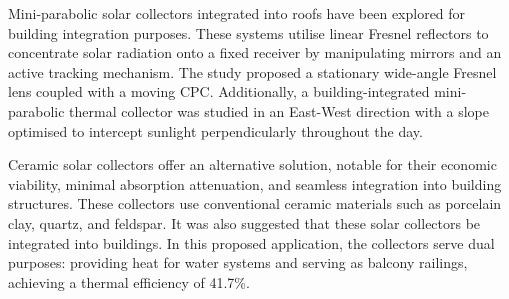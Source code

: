 
Mini-parabolic solar collectors integrated into roofs have been explored for building integration purposes. These systems utilise linear Fresnel reflectors to concentrate solar radiation onto a fixed receiver by manipulating mirrors and an active tracking mechanism. The study proposed a stationary wide-angle Fresnel lens coupled with a moving CPC. Additionally, a building-integrated mini-parabolic thermal collector was studied in an East-West direction with a slope optimised to intercept sunlight perpendicularly throughout the day.


Ceramic solar collectors offer an alternative solution, notable for their economic viability, minimal absorption attenuation, and seamless integration into building structures. These collectors use conventional ceramic materials such as porcelain clay, quartz, and feldspar. It was also suggested that these solar collectors be integrated into buildings. In this proposed application, the collectors serve dual purposes: providing heat for water systems and serving as balcony railings, achieving a thermal efficiency of 41.7\%. 


